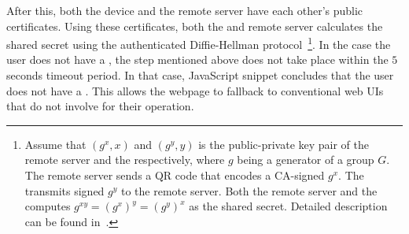 After this, both the device and the remote server have each other's public certificates. Using these certificates, both the \device and remote server calculates the shared secret using the authenticated Diffie-Hellman protocol~\footnote{Assume that $(g^x, x)$ and $(g^y, y)$ is the public-private key pair of the remote server and the \device respectively, where $g$ being a generator of a group $G$. The remote server sends a QR code that encodes a CA-signed $g^x$. The \device transmits signed $g^y$ to the remote server. Both the remote server and the \device computes $g^{xy}=(g^x)^y=(g^y)^x$ as the shared secret. Detailed description can be found  in~\cite{blake1998authenticated}.}. In the case the user does not have a \device, the step mentioned above does not take place within the $5$ seconds timeout period. In that case, \name JavaScript snippet concludes that the user does not have a \device. This allows the webpage to fallback to conventional web UIs that do not involve \device for their operation.


